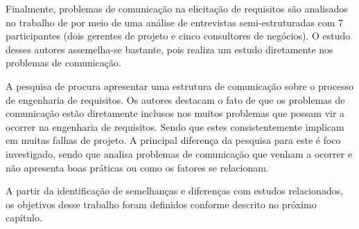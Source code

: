     Finalmente, problemas de comunicação na elicitação de requisitos são analisados no trabalho de  por meio de uma análise de entrevistas semi-estruturadas com 7 participantes (dois gerentes de projeto e cinco consultores de negócios). O estudo desses autores assemelha-se bastante, pois realiza um estudo diretamente nos problemas de comunicação. 
    
   A pesquisa de  procura apresentar uma estrutura de comunicação sobre o processo de engenharia de requisitos. Os autores destacam o fato de que os problemas de comunicação estão diretamente inclusos nos muitos problemas que possam vir a ocorrer na engenharia de requisitos. Sendo que estes consistentemente implicam em muitas falhas de projeto. A principal diferença da pesquisa para este é foco investigado, sendo que analisa problemas de comunicação que venham a ocorrer e não apresenta boas práticas ou como os fatores se relacionam. 
   
   A partir da identificação de semelhanças e diferenças com estudos relacionados, os objetivos desse trabalho foram definidos conforme descrito no próximo capítulo.

